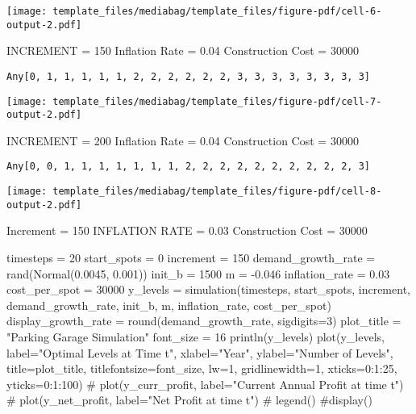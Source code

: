 \documentclass[
  letterpaper,
  DIV=11,
  numbers=noendperiod]{scrartcl}
\newenvironment{Shaded}{\begin{snugshade}}{\end{snugshade}}
\newcommand{\CommentTok}[1]{\textcolor[rgb]{0.37,0.37,0.37}{#1}}
\newcommand{\FloatTok}[1]{\textcolor[rgb]{0.68,0.00,0.00}{#1}}
\newcommand{\FunctionTok}[1]{\textcolor[rgb]{0.28,0.35,0.67}{#1}}
\newcommand{\NormalTok}[1]{\textcolor[rgb]{0.00,0.23,0.31}{#1}}
\newcommand{\OperatorTok}[1]{\textcolor[rgb]{0.37,0.37,0.37}{#1}}
\newcommand{\StringTok}[1]{\textcolor[rgb]{0.13,0.47,0.30}{#1}}
\begin{document}
\texttt{[image: template\_files/mediabag/template\_files/figure-pdf/cell-6-output-2.pdf]}

INCREMENT = 150 Inflation Rate = 0.04 Construction Cost = 30000

\begin{verbatim}
Any[0, 1, 1, 1, 1, 1, 2, 2, 2, 2, 2, 2, 3, 3, 3, 3, 3, 3, 3, 3]
\end{verbatim}

\texttt{[image: template\_files/mediabag/template\_files/figure-pdf/cell-7-output-2.pdf]}

INCREMENT = 200 Inflation Rate = 0.04 Construction Cost = 30000

\begin{verbatim}
Any[0, 0, 1, 1, 1, 1, 1, 1, 1, 2, 2, 2, 2, 2, 2, 2, 2, 2, 2, 3]
\end{verbatim}

\texttt{[image: template\_files/mediabag/template\_files/figure-pdf/cell-8-output-2.pdf]}

Increment = 150 INFLATION RATE = 0.03 Construction Cost = 30000

\begin{Shaded}
\begin{Highlighting}[]
\NormalTok{timesteps }\OperatorTok{=} \FloatTok{20} 
\NormalTok{start\_spots }\OperatorTok{=} \FloatTok{0}
\NormalTok{increment }\OperatorTok{=} \FloatTok{150}
\NormalTok{demand\_growth\_rate }\OperatorTok{=} \FunctionTok{rand}\NormalTok{(}\FunctionTok{Normal}\NormalTok{(}\FloatTok{0.0045}\NormalTok{, }\FloatTok{0.001}\NormalTok{))}
\NormalTok{init\_b }\OperatorTok{=} \FloatTok{1500}
\NormalTok{m }\OperatorTok{=} \OperatorTok{{-}}\FloatTok{0.046}
\NormalTok{inflation\_rate }\OperatorTok{=} \FloatTok{0.03}
\NormalTok{cost\_per\_spot }\OperatorTok{=} \FloatTok{30000}
\NormalTok{y\_levels }\OperatorTok{=} \FunctionTok{simulation}\NormalTok{(timesteps, start\_spots, increment, demand\_growth\_rate, init\_b, m, inflation\_rate, cost\_per\_spot)}
\NormalTok{display\_growth\_rate }\OperatorTok{=} \FunctionTok{round}\NormalTok{(demand\_growth\_rate, sigdigits}\OperatorTok{=}\FloatTok{3}\NormalTok{)}
\NormalTok{plot\_title }\OperatorTok{=} \StringTok{"Parking Garage Simulation"}
\NormalTok{font\_size }\OperatorTok{=} \FloatTok{16}
\FunctionTok{println}\NormalTok{(y\_levels)}
\FunctionTok{plot}\NormalTok{(y\_levels, label}\OperatorTok{=}\StringTok{"Optimal Levels at Time t"}\NormalTok{, xlabel}\OperatorTok{=}\StringTok{"Year"}\NormalTok{, ylabel}\OperatorTok{=}\StringTok{"Number of Levels"}\NormalTok{,}
\NormalTok{title}\OperatorTok{=}\NormalTok{plot\_title, titlefontsize}\OperatorTok{=}\NormalTok{font\_size, lw}\OperatorTok{=}\FloatTok{1}\NormalTok{, gridlinewidth}\OperatorTok{=}\FloatTok{1}\NormalTok{, xticks}\OperatorTok{=}\FloatTok{0}\OperatorTok{:}\FloatTok{1}\OperatorTok{:}\FloatTok{25}\NormalTok{, yticks}\OperatorTok{=}\FloatTok{0}\OperatorTok{:}\FloatTok{1}\OperatorTok{:}\FloatTok{100}\NormalTok{)}
\CommentTok{\# plot(y\_curr\_profit, label="Current Annual Profit at time t")}
\CommentTok{\# plot(y\_net\_profit, label="Net Profit at time t")}
\CommentTok{\# legend()}
\CommentTok{\#display()}
\end{Highlighting}
\end{Shaded}
\end{document}
